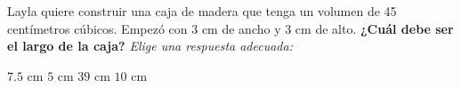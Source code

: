 Layla quiere construir una caja de madera que tenga un volumen de 45
centímetros cúbicos. Empezó con 3 cm de ancho y 3 cm de alto.
\textbf{¿Cuál debe ser el largo de la caja?}
\emph{Elige una respuesta adecuada:}

\begin{choices}
    \choice $7.5 \text{ cm}$
    \CorrectChoice $5 \text{ cm}$
    \choice $39 \text{ cm}$
    \choice $10 \text{ cm}$
\end{choices}